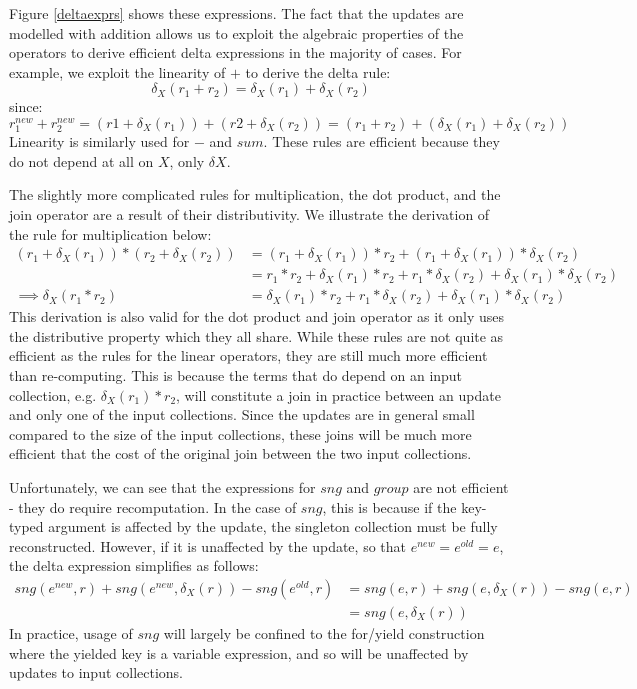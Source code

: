{{{Figure \ref{deltaexprs} shows these expressions. The fact that the updates are modelled with addition allows us to exploit the algebraic properties of the operators to derive efficient delta expressions in the majority of cases. For example, we exploit the linearity of $+$ to derive the delta rule:
\[\delta_X(r_1 + r_2) = \delta_X(r_1) + \delta_X(r_2)\]
since: 
\[r_1^{new} + r_2^{new} = (r1 + \delta_X(r_1)) + (r2 + \delta_X(r_2)) = (r_1 + r_2) + (\delta_X(r_1) + \delta_X(r_2))\]
Linearity is similarly used for $-$ and $sum$. These rules are efficient because they do not depend at all on $X$, only $\delta X$.

\vs The slightly more complicated rules for multiplication, the dot product, and the join operator are a result of their distributivity. We illustrate the derivation of the rule for multiplication below:
\begin{equation*}
\begin{split}
(r_1 + \delta_X(r_1))*(r_2 + \delta_X(r_2)) &= (r_1 + \delta_X(r_1))*r_2 + (r_1 + \delta_X(r_1))*\delta_X(r_2) \\
&= r_1*r_2 + \delta_X(r_1)*r_2 + r_1*\delta_X(r_2) + \delta_X(r_1) * \delta_X(r_2) \\
\implies \delta_X(r_1*r_2) &= \delta_X(r_1)*r_2 + r_1*\delta_X(r_2) + \delta_X(r_1) * \delta_X(r_2)
\end{split}
\end{equation*}
This derivation is also valid for the dot product and join operator as it only uses the distributive property which they all share. While these rules are not quite as efficient as the rules for the linear operators, they are still much more efficient than re-computing. This is because the terms that do depend on an input collection, e.g. $\delta_X(r_1) * r_2$, will constitute a join in practice between an update and only one of the input collections. Since the updates are in general small compared to the size of the input collections, these joins will be much more efficient that the cost of the original join between the two input collections.

\vs Unfortunately, we can see that the expressions for $sng$ and $group$ are not efficient - they do require recomputation. In the case of $sng$, this is because if the key-typed argument is affected by the update, the singleton collection must be fully reconstructed. However, if it is unaffected by the update, so that $e^{new} = e^{old} = e$, the delta expression simplifies as follows:
\begin{equation*}
\begin{split}
sng(e^{new},r) + sng(e^{new},\delta_X(r)) - sng(e^{old},r) &= sng(e,r) + sng(e,\delta_X(r)) - sng(e,r) \\
&= sng(e,\delta_X(r))
\end{split}
\end{equation*}
In practice, usage of $sng$ will largely be confined to the for/yield construction where the yielded key is a variable expression, and so will be unaffected by updates to input collections. 

}}}

